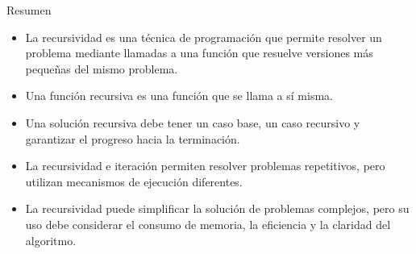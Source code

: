 \documentclass{beamer}
\begin{document}
    \begin{frame}{Resumen}
        \begin{itemize}
            \item La recursividad es una técnica de programación que permite resolver un problema mediante llamadas a una función que resuelve versiones más pequeñas del mismo problema.
            \pause
            \item Una función recursiva es una función que se llama a sí misma.
            \pause
            \item Una solución recursiva debe tener un caso base, un caso recursivo y garantizar el progreso hacia la terminación.
            \pause
            \item La recursividad e iteración permiten resolver problemas repetitivos, pero utilizan mecanismos de ejecución diferentes.
            \pause
            \item La recursividad puede simplificar la solución de problemas complejos, pero su uso debe considerar el consumo de memoria, la eficiencia y la claridad del algoritmo.
        \end{itemize}
    \end{frame}
\end{document}

